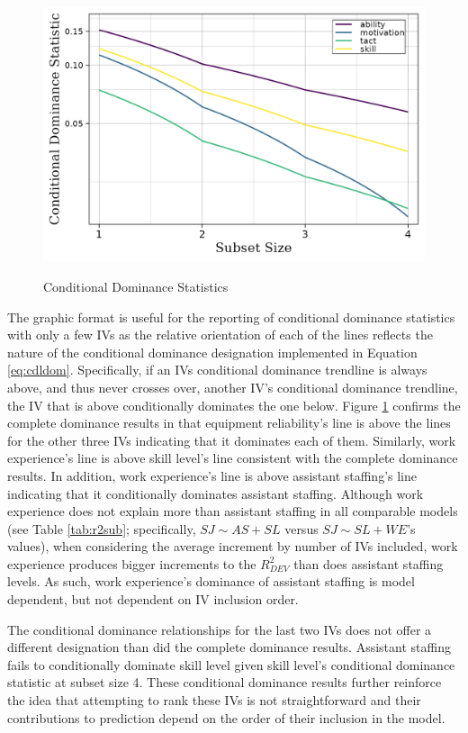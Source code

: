 \documentclass[man]{apa7}
\begin{document}
	\begin{figure}[h!]
		\centering
		\caption{\centering Conditional Dominance Statistics}
		\includegraphics{condit_gph}
		\label{fg:cdl}
	\end{figure}

	The graphic format is useful for the reporting of conditional dominance statistics with only a few IVs as the relative orientation of each of the lines reflects the nature of the conditional dominance designation implemented in Equation \ref{eq:cdldom}.
	Specifically, if an IVs conditional dominance trendline is always above, and thus never crosses over, another IV's conditional dominance trendline, the IV that is above conditionally dominates the one below.
	Figure \ref{fg:cdl} confirms the complete dominance results in that equipment reliability's line is above the lines for the other three IVs indicating that it dominates each of them.
	Similarly, work experience's line is above skill level's line consistent with the complete dominance results.
	In addition, work experience's line is above assistant staffing's line indicating that it conditionally dominates assistant staffing.
	Although work experience does not explain more than assistant staffing in all comparable models (see Table \ref{tab:r2sub}; specifically, $SJ \sim AS + SL$ versus $SJ \sim SL + WE$'s values), when considering the average increment by number of IVs included, work experience produces bigger increments to the $R^2_{DEV}$ than does assistant staffing levels. 
	As such, work experience's dominance of assistant staffing is model dependent, but not dependent on IV inclusion order.
	
	The conditional dominance relationships for the last two IVs does not offer a different designation than did the complete dominance results.
	Assistant staffing fails to conditionally dominate skill level given skill level's conditional dominance statistic at subset size 4.
	These conditional dominance results further reinforce the idea that attempting to rank these IVs is not straightforward and their contributions to prediction depend on the order of their inclusion in the model. 
	
\end{document}

